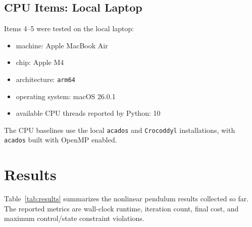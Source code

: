 \documentclass[11pt]{article}
\begin{document}
\subsection{CPU Items: Local Laptop}

Items 4--5 were tested on the local laptop:
\begin{itemize}
    \item machine: Apple MacBook Air
    \item chip: Apple M4
    \item architecture: \texttt{arm64}
    \item operating system: macOS 26.0.1
    \item available CPU threads reported by Python: 10
\end{itemize}

The CPU baselines use the local \texttt{acados} and \texttt{Crocoddyl}
installations, with \texttt{acados} built with OpenMP enabled.

\section{Results}

Table~\ref{tab:results} summarizes the nonlinear pendulum results collected so
far. The reported metrics are wall-clock runtime, iteration count, final cost,
and maximum control/state constraint violations.
\end{document}
